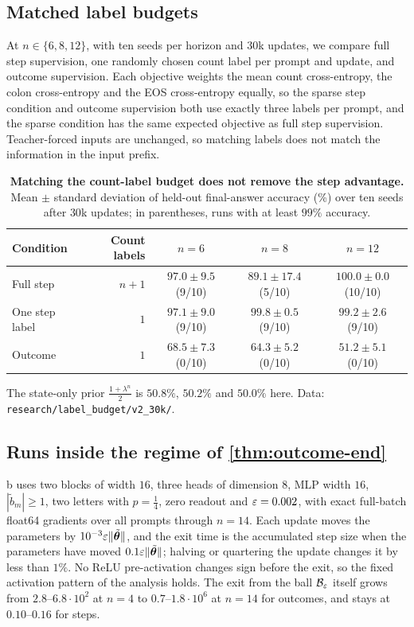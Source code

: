 \subsection{Matched label budgets}
\label{app:label-budget}
At $n\in\{6,8,12\}$, with ten seeds per horizon and $30$k updates, we compare full step supervision, one randomly chosen count label per
prompt and update, and outcome supervision. Each objective weights the mean count cross-entropy, the colon cross-entropy and the EOS
cross-entropy equally, so the sparse step condition and outcome supervision both use exactly three labels per prompt, and the sparse
condition has the same expected objective as full step supervision. Teacher-forced inputs are unchanged, so matching labels does not
match the information in the input prefix.

\begin{table}[H]
\centering\small
\begin{tabular}{@{}lrccc@{}}
\toprule
Condition & Count labels & $n=6$ & $n=8$ & $n=12$\\
\midrule
Full step & $n+1$ & $97.0\pm9.5$ (9/10) & $89.1\pm17.4$ (5/10) & $100.0\pm0.0$ (10/10)\\
One step label & $1$ & $97.1\pm9.0$ (9/10) & $99.8\pm0.5$ (9/10) & $99.2\pm2.6$ (9/10)\\
Outcome & $1$ & $68.5\pm7.3$ (0/10) & $64.3\pm5.2$ (0/10) & $51.2\pm5.1$ (0/10)\\
\bottomrule
\end{tabular}
\caption{\textbf{Matching the count-label budget does not remove the step advantage.} Mean $\pm$ standard deviation of
held-out final-answer accuracy (\%) over ten seeds after $30$k updates; in parentheses, runs with at least $99\%$ accuracy.}
\label{tab:label-budget}
\end{table}
The state-only prior $\frac{1+\lambda^n}2$ is $50.8\%$, $50.2\%$ and $50.0\%$ here. Data: \nolinkurl{research/label_budget/v2_30k/}.

\subsection{Runs inside the regime of \texorpdfstring{\cref{thm:outcome-end}}{Theorem 1(ii)}}
\label{app:exp-regime}
\label{app:regime}
b uses two blocks of width $16$, three heads of dimension $8$, MLP width $16$, $|\tilde b_m|\ge1$, two letters with
$p=\frac14$, zero readout and $\varepsilon=0.002$, with exact full-batch float64 gradients over all prompts through $n=14$. Each update moves the
parameters by $10^{-3}\varepsilon\|\tilde{\bm\theta}\|$, and the exit time is the accumulated step size when the parameters have moved
$0.1\varepsilon\|\tilde{\bm\theta}\|$; halving or quartering the update changes it by less than $1\%$. No ReLU pre-activation changes sign
before the exit, so the fixed activation pattern of the analysis holds. The exit from the ball $\mathcal B_{\varepsilon}$ itself grows from
$2.8$--$6.8\cdot10^2$ at $n=4$ to $0.7$--$1.8\cdot10^6$ at $n=14$ for outcomes, and stays at $0.10$--$0.16$ for steps.
\label{tab:exit-times}

